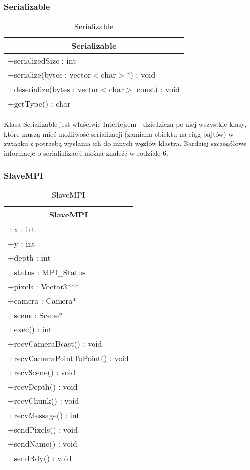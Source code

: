 \subsubsection{Serializable}

\footnotesize
\begin{longtable}{|p{14cm}|}
    \caption{Serializable} \label{tab:Serializable} \\ \hline
    \multicolumn{1}{|c|}{Serializable} \\ \hline
    +serializedSize : int \\ \hline
	+serialize(bytes : vector$<$char$>$*) : void \\ 
	+deserialize(bytes : vector$<$char$>$ const) : void \\
	+getType() : char \\
	\hline
\end{longtable}
\normalsize

Klasa Serializable jest właściwie Interfejsem - dziedziczą po niej wszystkie klasy, które muszą mieć możliwość serializacji (zamiana obiektu na ciąg bajtów) w związku z potrzebą wysłania ich do innych węzłów klastra. Bardziej szczegółowe informacje o serialializacji można znaleźć w rodziale 6.

\subsubsection{SlaveMPI}

\footnotesize
\begin{longtable}{|p{14cm}|}
    \caption{SlaveMPI} \label{tab:SlaveMPI} \\ \hline
    \multicolumn{1}{|c|}{SlaveMPI} \\ \hline
    +x : int \\ 
	+y : int \\
	+depth : int \\
	+status : MPI\_Status \\
	+pixels : Vector3*** \\
	+camera : Camera* \\
	+scene : Scene* \\ \hline
	+exec() : int \\
	+recvCameraBcast() : void \\
	+recvCameraPointToPoint() : void \\
	+recvScene() : void \\
	+recvDepth() : void \\
	+recvChunk() : void \\
	+recvMessage() : int \\
	+sendPixels() : void \\
	+sendName() : void \\
	+sendRdy() : void \\
	\hline
\end{longtable}
\normalsize


